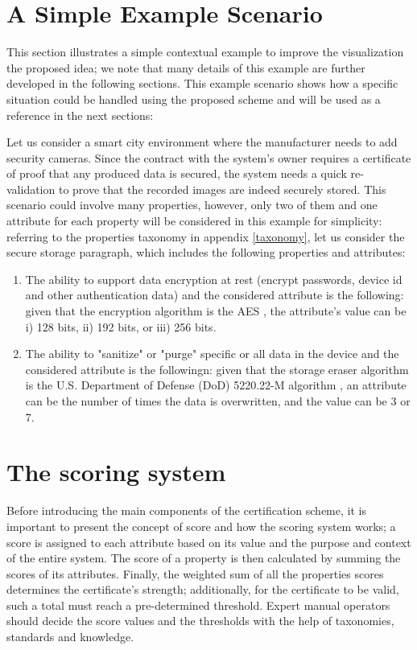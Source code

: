 \section{A Simple Example Scenario}
\label{scenario}
This section illustrates a simple contextual example to improve the visualization the proposed idea; we note that many details of this example are further developed in the following sections. This example scenario shows how a specific situation could be handled using the proposed scheme and will be used as a reference in the next sections:

Let us consider a smart city environment where the manufacturer needs to add security cameras. Since the contract with the system's owner requires a certificate of proof that any produced data is secured, the system needs a quick re-validation to prove that the recorded images are indeed securely stored. This scenario could involve many properties, however, only two of them and one attribute for each property will be considered in this example for simplicity: referring to the properties taxonomy in appendix \ref{taxonomy}, let us consider the secure storage paragraph, which includes the following properties and attributes:

\begin{enumerate}
    \item The ability to support data encryption at rest (encrypt passwords, device id and other authentication data) and the considered attribute is the following: given that the encryption algorithm is the AES \cite{daemen1999aes}, the attribute's value can be i) 128 bits, ii) 192 bits, or iii) 256 bits.
    
    \item The ability to "sanitize" or "purge" specific or all data in the device and the considered attribute is the followingn: given that the storage eraser algorithm is the U.S. Department of Defense (DoD) 5220.22-M algorithm \cite{fischer2017dod}, an attribute can be the number of times the data is overwritten, and the value can be 3 or 7.
\end{enumerate}





\section{The scoring system}
Before introducing the main components of the certification scheme, it is important to present the concept of score and how the scoring system works; a score is assigned to each attribute based on its value and the purpose and context of the entire system. The score of a property is then calculated by summing the scores of its attributes. Finally, the weighted sum of all the properties scores determines the certificate's strength; additionally, for the certificate to be valid, such a total must reach a pre-determined threshold. Expert manual operators should decide the score values and the thresholds with the help of taxonomies, standards and knowledge.

